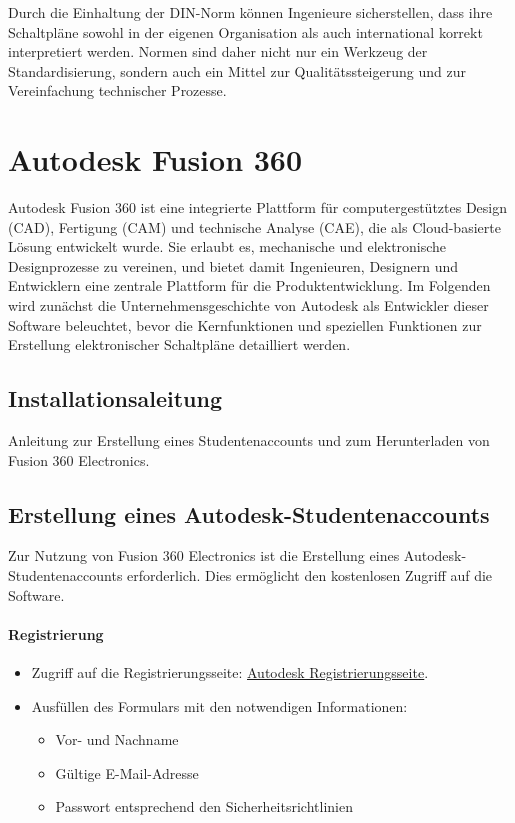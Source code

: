 Durch die Einhaltung der DIN-Norm können Ingenieure sicherstellen, dass ihre Schaltpläne sowohl in der eigenen Organisation als auch international korrekt interpretiert werden. Normen sind daher nicht nur ein Werkzeug der Standardisierung, sondern auch ein Mittel zur Qualitätssteigerung und zur Vereinfachung technischer Prozesse.

\section{Autodesk Fusion 360}
\label{Autodesk}
Autodesk Fusion 360 ist eine integrierte Plattform für computergestütztes Design (CAD), Fertigung (CAM) und technische Analyse (CAE), die als Cloud-basierte Lösung entwickelt wurde. Sie erlaubt es, mechanische und elektronische Designprozesse zu vereinen, und bietet damit Ingenieuren, Designern und Entwicklern eine zentrale Plattform für die Produktentwicklung. Im Folgenden wird zunächst die Unternehmensgeschichte von Autodesk als Entwickler dieser Software beleuchtet, bevor die Kernfunktionen und speziellen Funktionen zur Erstellung elektronischer Schaltpläne detailliert werden.
\subsection{Installationsaleitung}
Anleitung zur Erstellung eines Studentenaccounts und zum Herunterladen von Fusion 360 Electronics.

\subsection*{Erstellung eines Autodesk-Studentenaccounts}

Zur Nutzung von Fusion 360 Electronics ist die Erstellung eines Autodesk-Studentenaccounts erforderlich. Dies ermöglicht den kostenlosen Zugriff auf die Software.

\paragraph{ Registrierung}
\begin{itemize}
	\item Zugriff auf die Registrierungsseite: \href{https://accounts.autodesk.com/register?resume=/as/fMRyxxIM12/resume/as/authorization.ping&ack=uWlmiJuqQqVaAQjGdojc8Qxit4KVdorZ}{\underline{Autodesk Registrierungsseite}}.
	\item Ausfüllen des Formulars mit den notwendigen Informationen:
	\begin{itemize}
		\item Vor- und Nachname
		\item Gültige E-Mail-Adresse
		\item Passwort entsprechend den Sicherheitsrichtlinien
	\end{itemize}
\end{itemize}

